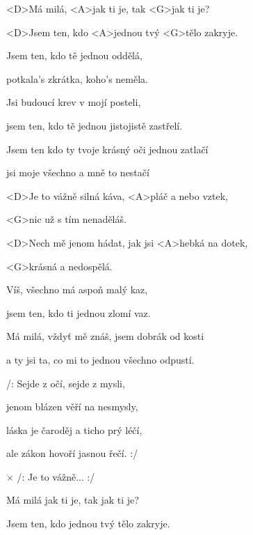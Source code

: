 

\zs
<D>Má milá, <A>jak ti je, tak <G>jak ti je?

<D>Jsem ten, kdo <A>jednou tvý <G>tělo zakryje.
\ks

\zs
Jsem ten, kdo tě jednou oddělá,

potkala's zkrátka, koho's neměla.
\ks

\zs
Jsi budoucí krev v mojí posteli,

jsem ten, kdo tě jednou jistojistě zastřelí.
\ks

\zs
Jsem ten kdo ty tvoje krásný oči jednou zatlačí

jsi moje všechno a mně to nestačí
\ks

\zr
<D>Je to vážně silná káva, <A>pláč a nebo vztek,

<G>nic už s tím nenaděláš.

<D>Nech mě jenom hádat, jak jsi <A>hebká na dotek,

<G>krásná a nedospělá.
\kr

\zs
Víš, všechno má aspoň malý kaz,

jsem ten, kdo ti jednou zlomí vaz.
\ks

\zs
Má milá, vždyť mě znáš, jsem dobrák od kosti

a ty jsi ta, co mi to jednou všechno odpustí.
\ks

\zs
/: Sejde z očí, sejde z mysli,

jenom blázen věří na nesmysly,

láska je čaroděj a ticho prý léčí,

ale zákon hovoří jasnou řečí. :/
\ks

$\times$ /: Je to vážně... :/
\kr

\zs
Má milá jak ti je, tak jak ti je?

Jsem ten, kdo jednou tvý tělo zakryje.
\ks

\kp
